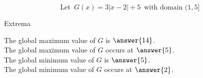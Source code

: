 \documentclass{ximera}
\author{Lee Wayand}
\begin{document}
\[
\text{Let } \, G(x) = 3|x-2| + 5 \, \text{ with domain } (1, 5] 
\]






\begin{exercise}  Extrema



The global maximum value of $G$ is $\answer{14}$. \\

The global maximum value of $G$ occurs at $\answer{5}$. \\

The global minimum value of $G$ is $\answer{5}$. \\

The global minimum value of $G$ occurs at $\answer{2}$. \\

\end{exercise}
\end{document}
